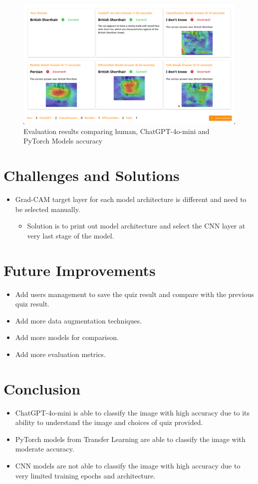 \documentclass{article}
\begin{document}
\begin{figure}[H]
    \centering
    \includegraphics[width=\textwidth]{evaluation.png}
    \caption{Evaluation results comparing human, ChatGPT-4o-mini and PyTorch Models accuracy}
    \label{fig:evaluation}
\end{figure}

\section{Challenges and Solutions}
\begin{itemize}
    \item Grad-CAM target layer for each model architecture is different and need to be selected manually.
    \begin{itemize}
        \item Solution is to print out model architecture and select the CNN layer at very last stage of the model.
    \end{itemize} 
\end{itemize}

\section{Future Improvements}
\begin{itemize}
    \item Add users management to save the quiz result and compare with the previous quiz result.
    \item Add more data augmentation techniques.
    \item Add more models for comparison.
    \item Add more evaluation metrics.
\end{itemize}

\section{Conclusion}
\begin{itemize}
    \item ChatGPT-4o-mini is able to classify the image with high accuracy due to its ability to understand the image and choices of quiz provided.
    \item PyTorch models from Transfer Learning are able to classify the image with moderate accuracy.
    \item CNN models are not able to classify the image with high accuracy due to very limited training epochs and architecture.
\end{itemize}
\end{document}
